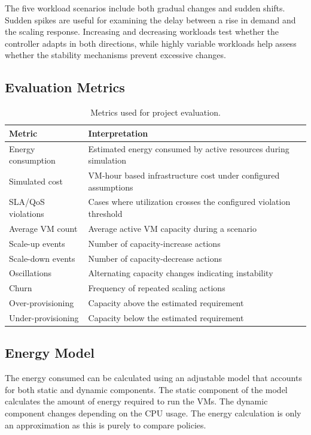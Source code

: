 \documentclass[10pt,journal,compsoc]{IEEEtran}
\begin{document}
The five workload scenarios include both gradual changes and sudden shifts. Sudden spikes are useful for examining the delay between a rise in demand and the scaling response. Increasing and decreasing workloads test whether the controller adapts in both directions, while highly variable workloads help assess whether the stability mechanisms prevent excessive changes.

\subsection{Evaluation Metrics}
\begin{table}[htbp]
\caption{Metrics used for project evaluation.}
\centering
\begin{tabular}{|p{3.2cm}|p{4.6cm}|}
\hline
\textbf{Metric} & \textbf{Interpretation} \\ \hline
Energy consumption & Estimated energy consumed by active resources during simulation \\ \hline
Simulated cost & VM-hour based infrastructure cost under configured assumptions \\ \hline
SLA/QoS violations & Cases where utilization crosses the configured violation threshold \\ \hline
Average VM count & Average active VM capacity during a scenario \\ \hline
Scale-up events & Number of capacity-increase actions \\ \hline
Scale-down events & Number of capacity-decrease actions \\ \hline
Oscillations & Alternating capacity changes indicating instability \\ \hline
Churn & Frequency of repeated scaling actions \\ \hline
Over-provisioning & Capacity above the estimated requirement \\ \hline
Under-provisioning & Capacity below the estimated requirement \\ \hline
\end{tabular}
\label{tab:metrics}
\end{table}

\subsection{Energy Model}
The energy consumed can be calculated using an adjustable model that accounts for both static and dynamic components. The static component of the model calculates the amount of energy required to run the VMs. The dynamic component changes depending on the CPU usage. The energy calculation is only an approximation as this is purely to compare policies.
\end{document}
